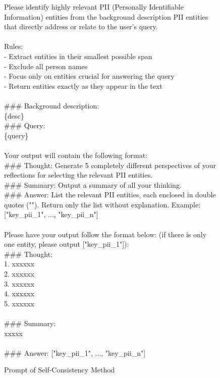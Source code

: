 \begin{figure*}[htbp]
\begin{tcolorbox}[colback=white, colframe=black, title=Self-Consistency Query-related PII Detection Prompt]
Please identify highly relevant PII (Personally Identifiable Information) entities from the background description PII entities that directly address or relate to the user's query.\\
\\
Rules:\\
- Extract entities in their smallest possible span\\
- Exclude all person names\\
- Focus only on entities crucial for answering the query\\
- Return entities exactly as they appear in the text\\
\\
\#\#\# Background description:\\
\{desc\}\\
\#\#\# Query:\\
\{query\}\\
\\
Your output will contain the following format:\\
\#\#\# Thought: Generate 5 completely different perspectives of your reflections for selecting the relevant PII entities.\\
\#\#\# Summary: Output a summary of all your thinking.\\
\#\#\# Answer: List the relevant PII entities, each enclosed in double quotes (""). Return only the list without explanation. Example: ["key\_pii\_1", ..., "key\_pii\_n"]\\
\\
Please have your output follow the format below: (if there is only one entity, please output ["key\_pii\_1"]):\\
\#\#\# Thought:\\
1. xxxxxx\\
2. xxxxxx\\
3. xxxxxx\\
4. xxxxxx\\
5. xxxxxx\\
\\
\#\#\# Summary:\\
xxxxx\\
\\
\#\#\# Answer: ["key\_pii\_1", ..., "key\_pii\_n"]\\
\end{tcolorbox}
\caption{Prompt of Self-Consistency Method}
\label{fig:self-consistency-prompt}
\end{figure*}

